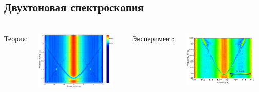 \documentclass[aspectratio=169, 13pt]{beamer}
\begin{document}
\subsection{Двухтоновая спектроскопия}
\begin{frame}[c]\frametitle{\secname}\framesubtitle{\subsecname}
\begin{columns}[c]
\centering
Теория:

\vspace{1cm}
\includegraphics[width=0.9\textwidth]{two_tone_spectrum_numerical}

\centering
Эксперимент:

\vspace{1cm}
\includegraphics[width=0.9\textwidth]{two-tone_spectrum}

\end{columns}
\end{frame}
\end{document}
